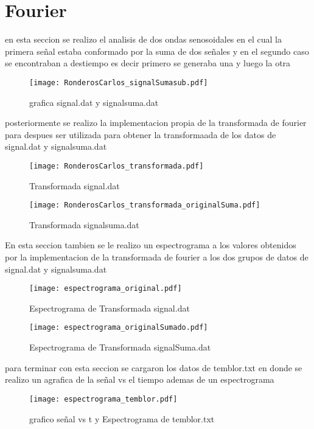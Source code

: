 \section{Fourier}
en esta seccion se realizo el analisis de dos ondas senosoidales en el cual la primera señal estaba conformado por la suma de dos señales y en el segundo caso se encontraban a destiempo es decir primero se generaba una y luego la otra

\begin{figure}[h!]
\centering
\texttt{[image: RonderosCarlos\_signalSumasub.pdf]}
\caption{grafica signal.dat y signalsuma.dat}
\label{Fig.}
\end{figure}

posteriormente se realizo la implementacion propia de la transformada de fourier para despues ser utilizada para obtener la transformaada de los datos de signal.dat y signalsuma.dat

\begin{figure}[h!]
\centering
\texttt{[image: RonderosCarlos\_transformada.pdf]}
\caption{Transformada signal.dat }
\label{Fig.}
\end{figure}

\begin{figure}[h!]
\centering
\texttt{[image: RonderosCarlos\_transformada\_originalSuma.pdf]}
\caption{Transformada signalsuma.dat }
\label{Fig.}
\end{figure}

En esta seccion tambien se le realizo un espectrograma a los valores obtenidos por la implementacion de la transformada de fourier a los dos grupos de datos de signal.dat y signalsuma.dat

\begin{figure}[h!]
\centering
\texttt{[image: espectrograma\_original.pdf]}
\caption{Espectrograma de Transformada signal.dat }
\label{Fig.}
\end{figure}

\begin{figure}[h!]
\centering
\texttt{[image: espectrograma\_originalSumado.pdf]}
\caption{Espectrograma de Transformada signalSuma.dat }
\label{Fig.}
\end{figure}

para terminar con esta seccion se cargaron los datos de temblor.txt en donde se realizo un agrafica de la señal vs el tiempo ademas de un espectrograma 

\begin{figure}[h!]
\centering
\texttt{[image: espectrograma\_temblor.pdf]}
\caption{grafico señal vs t y Espectrograma de temblor.txt }
\label{Fig.}
\end{figure}


